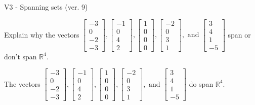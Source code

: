 \begin{exercise}
  \begin{exerciseTitle}V3 - Spanning sets (ver. 9)\end{exerciseTitle}
  \begin{exerciseStatement}
    Explain why the vectors \(\left[\begin{array}{r}
-3 \\
0 \\
-2 \\
-3
\end{array}\right] , \left[\begin{array}{r}
-1 \\
0 \\
4 \\
2
\end{array}\right] , \left[\begin{array}{r}
1 \\
0 \\
0 \\
0
\end{array}\right] , \left[\begin{array}{r}
-2 \\
0 \\
3 \\
1
\end{array}\right] , \text{ and } \left[\begin{array}{r}
3 \\
4 \\
1 \\
-5
\end{array}\right]\) span or don't span \(\mathbb{R}^4\). 
	


  \end{exerciseStatement}
  \begin{exerciseAnswer}
   The vectors \(\left[\begin{array}{r}
-3 \\
0 \\
-2 \\
-3
\end{array}\right] , \left[\begin{array}{r}
-1 \\
0 \\
4 \\
2
\end{array}\right] , \left[\begin{array}{r}
1 \\
0 \\
0 \\
0
\end{array}\right] , \left[\begin{array}{r}
-2 \\
0 \\
3 \\
1
\end{array}\right] , \text{ and } \left[\begin{array}{r}
3 \\
4 \\
1 \\
-5
\end{array}\right]\) 
  	 do  
	span \(\mathbb{R}^4\).
  


  \end{exerciseAnswer}
\end{exercise}